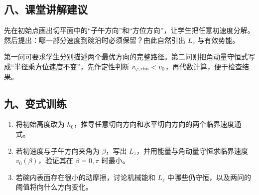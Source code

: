 \documentclass[12pt,a4paper,UTF8]{ctexart}
\newcommand{\tightlist}{\setlength{\itemsep}{0pt}\setlength{\parskip}{0pt}}
\begin{document}
\subsection{八、课堂讲解建议}\label{ux516bux8bfeux5802ux8bb2ux89e3ux5efaux8bae-7}

先在初始点画出切平面中的``子午方向''和``方位方向''，让学生把任意初速度分解。然后提出：哪一部分速度到碗沿时必须保留？由此自然引出
\(L_z\) 与有效势能。

第一问可要求学生分别描述两个最优方向的完整路径。第二问则把角动量守恒式写成``半径乘方位速度不变''，先作定性判断
\(v_{\varphi,\rm rim}<v_0\)，再代数计算，便于检查结果。

\subsection{九、变式训练}\label{ux4e5dux53d8ux5f0fux8badux7ec3-7}

\begin{enumerate}
\def\labelenumi{\arabic{enumi}.}
\tightlist
\item
  将初始高度改为
  \(h_0\)，推导任意切向方向和水平切向方向的两个临界速度通式。
\item
  若初速度与子午方向夹角为 \(\beta\)，写出
  \(L_z\)，并用能量与角动量守恒求临界速度 \(v_0(\beta)\)，验证其在
  \(\beta=0,\pi\) 时最小。
\item
  若碗内表面存在很小的动摩擦，讨论机械能和 \(L_z\)
  中哪些仍守恒，以及两问的阈值将向什么方向变化。
\end{enumerate}
\end{document}
